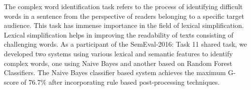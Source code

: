 The complex word identification task refers to the process of identifying difficult words in a sentence from the perspective of readers belonging to a specific target audience. This task has immense importance in the field of lexical simplification. Lexical simplification helps in improving the readability of texts consisting of challenging words. As a participant of the SemEval-2016: Task 11 shared task, we developed two systems using various lexical and semantic features to identify complex words, one using Naive Bayes and another based on Random Forest Classifiers. The Naive Bayes classifier based system achieves the maximum G-score of 76.7\% after incorporating rule based post-processing techniques.
